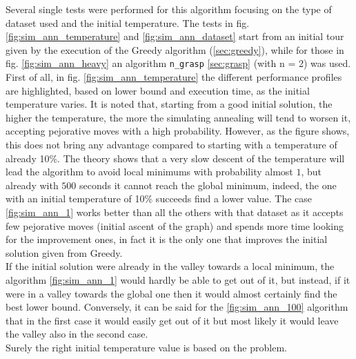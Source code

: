 Several single tests were performed for this algorithm focusing on the type of dataset used and the initial temperature. The tests in fig. \ref{fig:sim_ann_temperature} and \ref{fig:sim_ann_dataset} start from an initial tour given by the execution of the Greedy algorithm (\ref{sec:greedy}), while for those in fig. \ref{fig:sim_ann_heavy} an algorithm \texttt{n\_grasp} \ref{sec:grasp} (with n = 2) was used. 
First of all, in fig. \ref{fig:sim_ann_temperature} the different performance profiles are highlighted, based on lower bound and execution time, as the initial temperature varies. It is noted that, starting from a good initial solution, the higher the temperature, the more the simulating annealing will tend to worsen it, accepting pejorative moves with a high probability. However, as the figure shows, this does not bring any advantage compared to starting with a temperature of already 10\%. The theory shows that a very slow descent of the temperature will lead the algorithm to avoid local minimums with probability almost $1$, but already with $500$ seconds it cannot reach the global minimum, indeed, the one with an initial temperature of 10\% succeeds find a lower value.
The case \ref{fig:sim_ann_1} works better than all the others with that dataset as it accepts few pejorative moves (initial ascent of the graph) and spends more time looking for the improvement ones, in fact it is the only one that improves the initial solution given from Greedy.\\
If the initial solution were already in the valley towards a local minimum, the algorithm \ref{fig:sim_ann_1} would hardly be able to get out of it, but instead, if it were in a valley towards the global one then it would almost certainly find the best lower bound. Conversely, it can be said for the \ref{fig:sim_ann_100} algorithm that in the first case it would easily get out of it but most likely it would leave the valley also in the second case.\\
Surely the right initial temperature value is based on the problem.
